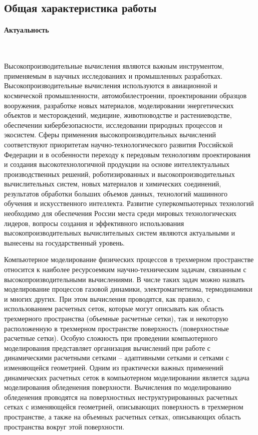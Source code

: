 \documentclass[a4paper,14pt]{extarticle}                     %
\theoremstyle{plain}                                         %
\begin{document}
\newpage
\subsection*{Общая характеристика работы}

\paragraph{Актуальность} \

Высокопроизводительные вычисления являются важным инструментом, применяемым в научных исследованиях и промышленных разработках.
Высокопроизводительные вычисления используются в авиационной и космической промышленности, автомобилестроении, проектировании образцов вооружения, разработке новых материалов, моделировании энергетических объектов и месторождений, медицине, животноводстве и растениеводстве, обеспечении кибербезопасности, исследовании природных процессов и экосистем.
Сферы применения высокопроизводительных вычислений соответствуют приоритетам научно-технологического развития Российской Федерации и в особенности переходу к передовым технологиям проектирования и создания высокотехнологичной продукции на основе интеллектуальных производственных решений, роботизированных и высокопроизводительных вычислительных систем, новых материалов и химических соединений, результатов обработки больших объемов данных, технологий машинного обучения и искусственного интеллекта.
Развитие суперкомпьютерных технологий необходимо для обеспечения России места среди мировых технологических лидеров, вопросы создания и эффективного использования высокопроизводительных вычислительных систем являются актуальными и вынесены на государственный уровень.

Компьютерное моделирование физических процессов в трехмерном пространстве относится к наиболее ресурсоемким научно-техническим задачам, связанным с высокопроизводительными вычислениями.
В числе таких задач можно назвать моделирование процессов газовой динамики, электромагнетизма, термодинамики и многих других.
При этом вычисления проводятся, как правило, с использованием расчетных сеток, которые могут описывать как область трехмерного пространства (объемные расчетные сетки), так и некоторую расположенную в трехмерном пространстве поверхность (поверхностные расчетные сетки).
Особую сложность при проведении компьютерного моделирования представляет организация вычислений при работе с динамическими расчетными сетками -- адаптивными сетками и сетками с изменяющейся геометрией.
Одним из практически важных применений динамических расчетных сеток в компьютерном моделировании является задача моделирования обледенения поверхности.
Вычисления по моделированию обледенения проводятся на поверхностных неструктурированных расчетных сетках с изменяющейся геометрией, описывающих поверхность в трехмерном пространстве, а также на объемных расчетных сетках, описывающих область пространства вокруг этой поверхности.
\end{document}
